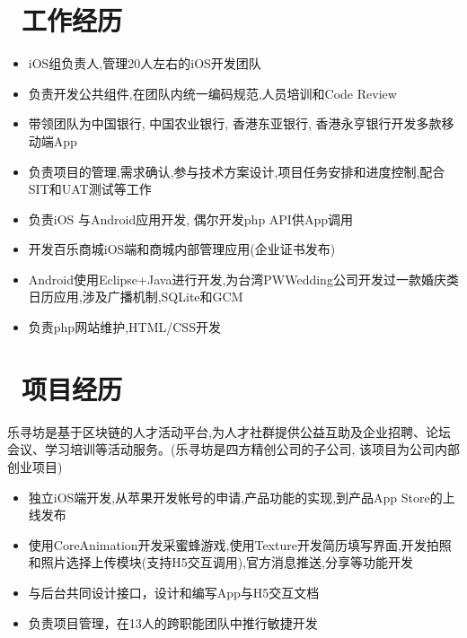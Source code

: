 \documentclass{resume}
\begin{document}
\section{\faHistory\ 工作经历}
\begin{itemize}
  \item iOS组负责人,管理20人左右的iOS开发团队
  \item 负责开发公共组件,在团队内统一编码规范,人员培训和Code Review
  \item 带领团队为中国银行, 中国农业银行, 香港东亚银行, 香港永亨银行开发多款移动端App
  \item 负责项目的管理,需求确认,参与技术方案设计,项目任务安排和进度控制,配合SIT和UAT测试等工作
\end{itemize}

\begin{itemize}
  \item 负责iOS 与Android应用开发, 偶尔开发php API供App调用
  \item 开发百乐商城iOS端和商城内部管理应用(企业证书发布)
  \item Android使用Eclipse+Java进行开发,为台湾PWWedding公司开发过一款婚庆类日历应用,涉及广播机制,SQLite和GCM
\end{itemize}

\begin{itemize}
  \item 负责php网站维护,HTML/CSS开发
\end{itemize}

\section{\faUsers\ 项目经历}
\begin{onehalfspacing}
乐寻坊是基于区块链的人才活动平台,为人才社群提供公益互助及企业招聘、论坛会议、学习培训等活动服务。(乐寻坊是四方精创公司的子公司, 该项目为公司内部创业项目)  
\begin{itemize}
  \item 独立iOS端开发,从苹果开发帐号的申请,产品功能的实现,到产品App Store的上线发布
  \item 使用CoreAnimation开发采蜜蜂游戏,使用Texture开发简历填写界面,开发拍照和照片选择上传模块(支持H5交互调用),官方消息推送,分享等功能开发
  \item 与后台共同设计接口，设计和编写App与H5交互文档
  \item 负责项目管理，在13人的跨职能团队中推行敏捷开发
\end{itemize}
\end{onehalfspacing}
\end{document}
